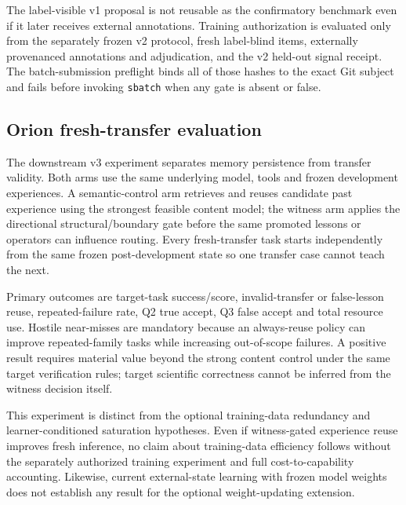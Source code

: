 The label-visible v1 proposal is not reusable as the confirmatory benchmark even
if it later receives external annotations.  Training authorization is evaluated
only from the separately frozen v2 protocol, fresh label-blind items, externally
provenanced annotations and adjudication, and the v2 held-out signal receipt.  The
batch-submission preflight binds all of those hashes to the exact Git subject and
fails before invoking \texttt{sbatch} when any gate is absent or false.


\subsection{Orion fresh-transfer evaluation}
The downstream v3 experiment separates memory persistence from transfer validity. Both arms use the same underlying model, tools and frozen development experiences. A semantic-control arm retrieves and reuses candidate past experience using the strongest feasible content model; the witness arm applies the directional structural/boundary gate before the same promoted lessons or operators can influence routing. Every fresh-transfer task starts independently from the same frozen post-development state so one transfer case cannot teach the next.

Primary outcomes are target-task success/score, invalid-transfer or false-lesson reuse, repeated-failure rate, Q2 true accept, Q3 false accept and total resource use. Hostile near-misses are mandatory because an always-reuse policy can improve repeated-family tasks while increasing out-of-scope failures. A positive result requires material value beyond the strong content control under the same target verification rules; target scientific correctness cannot be inferred from the witness decision itself.

This experiment is distinct from the optional training-data redundancy and learner-conditioned saturation hypotheses. Even if witness-gated experience reuse improves fresh inference, no claim about training-data efficiency follows without the separately authorized training experiment and full cost-to-capability accounting. Likewise, current external-state learning with frozen model weights does not establish any result for the optional weight-updating extension.
